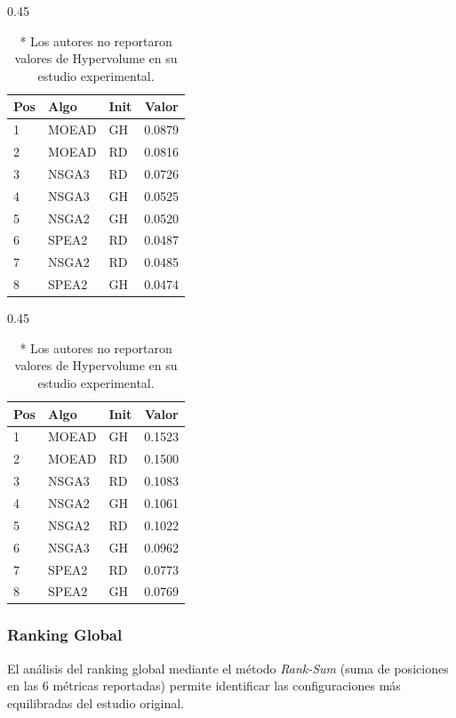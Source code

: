 \documentclass[a4paper,10pt]{article} %
\begin{document}
\begin{table}[H]
    \centering
    \begin{subtable}[t]{0.45\textwidth}
        \centering
        \caption{Avg. Tolerance Rate ($\uparrow$)}
        \begin{tabular}{lllc}
            \toprule
            Pos & Algo & Init & Valor \\
            \midrule
            1 & MOEAD & GH & 0.0879 \\
            2 & MOEAD & RD & 0.0816 \\
            3 & NSGA3 & RD & 0.0726 \\
            4 & NSGA3 & GH & 0.0525 \\
            5 & NSGA2 & GH & 0.0520 \\
            6 & SPEA2 & RD & 0.0487 \\
            7 & NSGA2 & RD & 0.0485 \\
            8 & SPEA2 & GH & 0.0474 \\
            \bottomrule
        \end{tabular}
    \end{subtable}
    \hfill
    \begin{subtable}[t]{0.45\textwidth}
        \centering
        \caption{Avg. Hamming ($\uparrow$)}
        \begin{tabular}{lllc}
            \toprule
            Pos & Algo & Init & Valor \\
            \midrule
            1 & MOEAD & GH & 0.1523 \\
            2 & MOEAD & RD & 0.1500 \\
            3 & NSGA3 & RD & 0.1083 \\
            4 & NSGA2 & GH & 0.1061 \\
            5 & NSGA2 & RD & 0.1022 \\
            6 & NSGA3 & GH & 0.0962 \\
            7 & SPEA2 & RD & 0.0773 \\
            8 & SPEA2 & GH & 0.0769 \\
            \bottomrule
        \end{tabular}
    \end{subtable}
    \caption*{* Los autores no reportaron valores de Hypervolume en su estudio experimental.}
\end{table}

\subsubsection{Ranking Global}
El análisis del ranking global mediante el método \textit{Rank-Sum} (suma de posiciones en las 6 métricas reportadas) permite identificar las configuraciones más equilibradas del estudio original.
\end{document}
